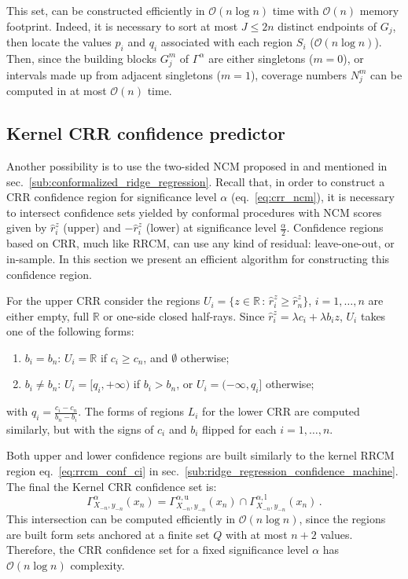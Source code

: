 \documentclass[a4paper,14pt]{extarticle}
\newcommand{\BigO}{\mathcal{O}}
\newcommand{\Real}{\mathbb{R}}
\begin{document}
This set, can be constructed efficiently in $\BigO(n \log{} n)$ time with $\BigO(n)$
memory footprint. Indeed, it is necessary to sort at most $J\leq 2n$ distinct endpoints
of $G_j$, then locate the values $p_i$ and $q_i$ associated with each region $S_i$
($\BigO(n \log{} n)$). Then, since the building blocks $G^m_j$ of $\Gamma^\alpha$
are either singletons ($m=0$), or intervals made up from adjacent singletons ($m=1$),
coverage numbers $N^m_j$ can be computed in at most $\BigO(n)$ time.


\subsection{Kernel CRR confidence predictor} %
\label{sub:kernel_crr}
Another possibility is to use the two-sided NCM proposed in \cite{burnaevV14} and
mentioned in sec.~\ref{sub:conformalized_ridge_regression}. Recall that, in order
to construct a CRR confidence region for significance level $\alpha$ (eq.~\ref{eq:crr_ncm}),
it is necessary to intersect confidence sets yielded by conformal procedures with NCM
scores given by $\hat{r}_i^z$ (upper) and $-\hat{r}_i^z$ (lower) at significance level
$\frac{\alpha}{2}$. Confidence regions based on CRR, much like RRCM, can use any kind
of residual: leave-one-out, or in-sample. In this section we present an efficient
algorithm for constructing this confidence region.

For the upper CRR consider the regions $U_i = \{z\in\Real\,:\, \hat{r}_i^z \geq \hat{r}_n^z\}$,
$i=1,\ldots, n$ are either empty, full $\Real$ or one-side closed half-rays. Since
$\hat{r}_i^z = \lambda c_i + \lambda b_i z$, $U_i$ takes one of the following forms:
\begin{enumerate}
  \item $b_i=b_n$: $U_i = \Real$ if $c_i\geq c_n$, and $\emptyset$ otherwise;
  \item $b_i\neq b_n$: $U_i = [q_i, +\infty)$ if $b_i>b_n$, or
  $U_i = (-\infty, q_i]$ otherwise;
\end{enumerate}
with $q_i = \frac{c_i-c_n}{b_n-b_i}$. The forms of regions $L_i$ for the lower CRR
are computed similarly, but with the signs of $c_i$ and $b_i$ flipped for each $i=1, \ldots, n$.

Both upper and lower confidence regions are built similarly to the kernel RRCM region
eq.~\ref{eq:rrcm_conf_ci} in sec.~\ref{sub:ridge_regression_confidence_machine}. The
final the Kernel CRR confidence set is:
\begin{equation} \label{eq:crr_conf_ci}
  \Gamma_{X_{-n}, y_{-n}}^\alpha(x_n)
    = \Gamma_{X_{-n}, y_{-n}}^{\alpha,\text{u}}(x_n)
    \cap \Gamma_{X_{-n}, y_{-n}}^{\alpha,\text{l}}(x_n)
    \,.
\end{equation}
This intersection can be computed efficiently in $\BigO(n \log{} n)$, since the regions
are built form sets anchored at a finite set $Q$ with at most $n+2$ values. Therefore,
the CRR confidence set for a fixed significance level $\alpha$ has $\BigO(n\log{} n)$
complexity.
\end{document}
